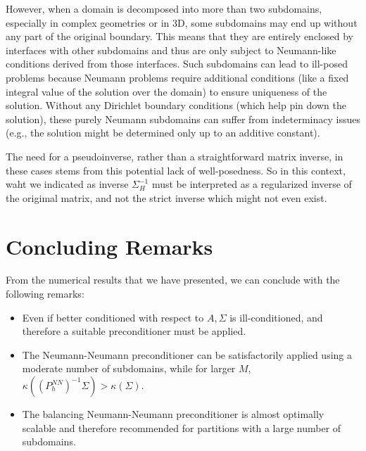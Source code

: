 \documentclass[11pt]{book}
\begin{document}
However, when a domain is decomposed into more than two subdomains, especially in complex geometries or in 3D, some subdomains may end up without any part of the original boundary. This means that they are entirely enclosed by interfaces with other subdomains and thus are only subject to Neumann-like conditions derived from those interfaces. Such subdomains can lead to ill-posed problems because Neumann problems require additional conditions (like a fixed integral value of the solution over the domain) to ensure uniqueness of the solution. Without any Dirichlet boundary conditions (which help pin down the solution), these purely Neumann subdomains can suffer from indeterminacy issues (e.g., the solution might be determined only up to an additive constant).

The need for a pseudoinverse, rather than a straightforward matrix inverse, in these cases stems from this potential lack of well-posedness. So in this context, waht we indicated as inverse $\Sigma_{H}^{-1}$ must be interpreted as a regularized inverse of the origimal matrix, and not the strict inverse which might not even exist.

\section*{Concluding Remarks}
From the numerical results that we have presented, we can conclude with the following remarks:
\begin{itemize}
  \item Even if better conditioned with respect to $A, \Sigma$ is ill-conditioned, and therefore a suitable preconditioner must be applied.
  \item The Neumann-Neumann preconditioner can be satisfactorily applied using a moderate number of subdomains, while for larger $M$, $\kappa\left(\left(P_{h}^{N N}\right)^{-1} \Sigma\right)>\kappa(\Sigma)$.
  \item The balancing Neumann-Neumann preconditioner is almost optimally scalable and therefore recommended for partitions with a large number of subdomains.
\end{itemize}
\end{document}
